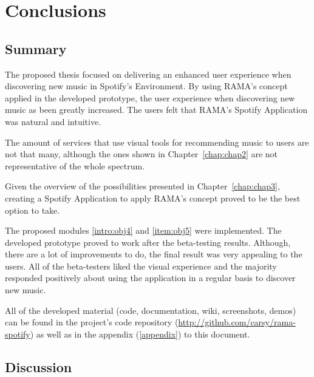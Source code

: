 
\chapter{Conclusions}
\label{chap:chap5}

\section*{}


\section{Summary} %
\label{sec:summary}

  The proposed thesis focused on delivering an enhanced user experience when discovering new music in Spotify's Environment.
  By using RAMA's concept applied in the developed prototype, the user experience when discovering new music as been greatly increased.
  The users felt that RAMA's Spotify Application was natural and intuitive.

  The amount of services that use visual tools for recommending music to users are not that many, although the ones shown in Chapter~\ref{chap:chap2} are not representative of the whole spectrum.

  Given the overview of the possibilities presented in Chapter~\ref{chap:chap3}, creating a Spotify Application to apply RAMA's concept proved to be the best option to take.

  The proposed modules \ref{intro:obj4} and \ref{item:obj5} were implemented.
  The developed prototype proved to work after the beta-testing results.
  Although, there are a lot of improvements to do, the final result was very appealing to the users.
  All of the beta-testers liked the visual experience and the majority responded positively about using the application in a regular basis to discover new music.

  All of the developed material (code, documentation, wiki, screenshots, demos) can be found in the project's code repository (\url{http://github.com/carsy/rama-spotify}) as well as in the appendix (\ref{appendix}) to this document.



\section{Discussion} %
\label{sec:discussion}

